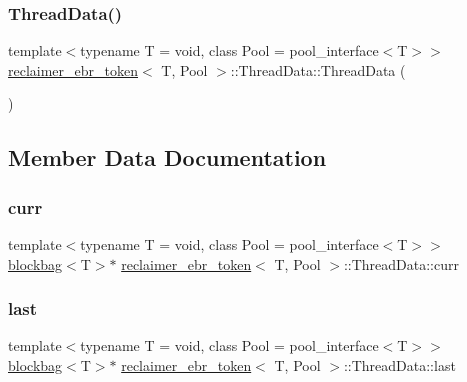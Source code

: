 \subsubsection{\texorpdfstring{Thread\+Data()}{ThreadData()}}
{\footnotesize\ttfamily template$<$typename T  = void, class Pool  = pool\+\_\+interface$<$\+T$>$$>$ \\
\hyperlink{classreclaimer__ebr__token}{reclaimer\+\_\+ebr\+\_\+token}$<$ T, Pool $>$\+::Thread\+Data\+::\+Thread\+Data (\begin{DoxyParamCaption}{ }\end{DoxyParamCaption})\hspace{0.3cm}{\ttfamily [inline]}}



\subsection{Member Data Documentation}
\mbox{\label{classreclaimer__ebr__token_1_1ThreadData_affa120c770d3a6fb2b3fae1e3c5559ed}} 
\subsubsection{\texorpdfstring{curr}{curr}}
{\footnotesize\ttfamily template$<$typename T  = void, class Pool  = pool\+\_\+interface$<$\+T$>$$>$ \\
\hyperlink{classblockbag}{blockbag}$<$T$>$$\ast$ \hyperlink{classreclaimer__ebr__token}{reclaimer\+\_\+ebr\+\_\+token}$<$ T, Pool $>$\+::Thread\+Data\+::curr}

\mbox{\label{classreclaimer__ebr__token_1_1ThreadData_a26b4385b902f289bdc1235b7eff1c877}} 
\subsubsection{\texorpdfstring{last}{last}}
{\footnotesize\ttfamily template$<$typename T  = void, class Pool  = pool\+\_\+interface$<$\+T$>$$>$ \\
\hyperlink{classblockbag}{blockbag}$<$T$>$$\ast$ \hyperlink{classreclaimer__ebr__token}{reclaimer\+\_\+ebr\+\_\+token}$<$ T, Pool $>$\+::Thread\+Data\+::last}

